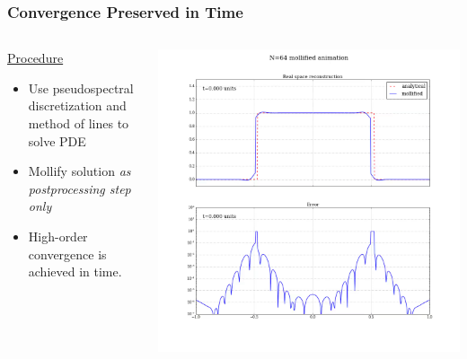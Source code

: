 \documentclass[9pt,usepdftitle=false,aspectratio=169]{beamer}
\begin{document}
\begin{frame}
  \frametitle{Convergence Preserved in Time}
  \begin{columns}
    \begin{column}{0.5\textwidth}
      \begin{center}
        \underline{\huge\color{blue}Procedure}
      \end{center}
      \begin{itemize}
      \item Use pseudospectral discretization and method of lines to
        solve PDE
      \item Mollify solution \textit{as postprocessing step only}
      \item High-order convergence is achieved in time.
      \end{itemize}
    \end{column}
    \begin{column}{0.5\textwidth}
      \includegraphics[height=0.95\textheight]{movie/frame_0001}
    \end{column}
  \end{columns}
\end{frame}
\end{document}
